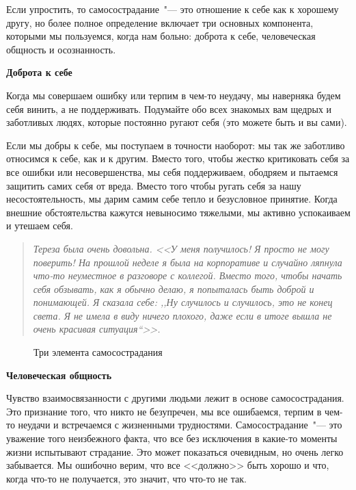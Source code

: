 Если упростить, то самосострадание~"--- это отношение к себе как к хорошему другу, но более полное определение включает три основных компонента, которыми мы пользуемся, когда нам больно: доброта к себе, человеческая общность и осознанность.

\vspace{3ex} 

{\large \textbf{Доброта к себе}}

\vspace{1ex} 

Когда мы совершаем ошибку или терпим в чем-то неудачу, мы наверняка будем себя винить, а не поддерживать. Подумайте обо всех знакомых вам щедрых и заботливых людях, которые постоянно ругают себя (это можете быть и вы сами). 

Если мы добры к себе, мы поступаем в точности наоборот: мы так же заботливо относимся к себе, как и к другим. Вместо того, чтобы жестко критиковать себя за все ошибки или несовершенства, мы себя поддерживаем, ободряем и пытаемся защитить самих себя от вреда. Вместо того чтобы ругать себя за нашу несостоятельность, мы дарим самим себе тепло и безусловное принятие. Когда внешние обстоятельства кажутся невыносимо тяжелыми, мы активно успокаиваем и утешаем себя. 

\begin{quotation}
	\textit{
		Тереза была очень довольна. <<У меня получилось! Я просто не могу поверить! На прошлой неделе я была на корпоративе и случайно ляпнула  что-то неуместное в разговоре с коллегой. Вместо того, чтобы начать себя обзывать, как я обычно делаю, я попыталась быть доброй и понимающей. Я сказала себе: ,,Ну случилось и случилось, это не конец света. Я не имела в виду ничего плохого, даже если в итоге вышла не очень красивая ситуация``>>.
	}
\end{quotation}

\begin{figure}[h]
	\begin{center}
		
		\caption{Три элемента самосострадания}
	\end{center}
\end{figure}

\vspace{3ex} 

{\large \textbf{Человеческая общность}}

\vspace{1ex} 

 Чувство взаимосвязанности с другими людьми лежит в основе самосострадания. Это признание того, что никто не безупречен, мы все ошибаемся, терпим в чем-то неудачи и встречаемся с жизненными трудностями. Самосострадание~"--- это уважение того неизбежного факта, что все без исключения в какие-то моменты жизни испытывают страдание. Это может показаться очевидным, но очень легко забывается. Мы ошибочно верим, что все <<должно>> быть хорошо и что, когда что-то не получается, это значит, что что-то не так. 

